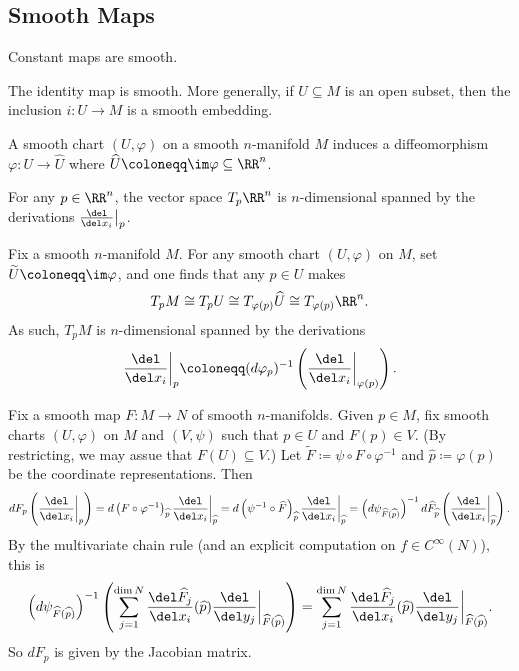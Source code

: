 \documentclass{article}
\begin{document}
\subsection{Smooth Maps}
\begin{example}
	Constant maps are smooth.
\end{example}
\begin{example}
	The identity map is smooth. More generally, if $U\subseteq M$ is an open subset, then the inclusion $i\colon U\to M$ is a smooth embedding.
\end{example}
\begin{example}
	A smooth chart $(U,\varphi)$ on a smooth $n$-manifold $M$ induces a diffeomorphism $\varphi\colon U\to\widehat U$ where $\widehat U\coloneqq\im\varphi\subseteq\RR^n$.
\end{example}
\begin{example}
	For any $p\in\RR^n$, the vector space $T_p\RR^n$ is $n$-dimensional spanned by the derivations $\frac{\del}{\del x_i}\big|_p$.
\end{example}
\begin{example}
	Fix a smooth $n$-manifold $M$. For any smooth chart $(U,\varphi)$ on $M$, set $\widetilde U\coloneqq\im\varphi$, and one finds that any $p\in U$ makes
	\[T_pM\cong T_pU\cong T_{\varphi(p)}\widehat U\cong T_{\varphi(p)}\RR^n.\]
	As such, $T_pM$ is $n$-dimensional spanned by the derivations
	\[\frac{\del}{\del x_i}\bigg|_p\coloneqq(d\varphi_p)^{-1}\left(\frac{\del}{\del x_i}\bigg|_{\varphi(p)}\right).\]
\end{example}
\begin{example}
	Fix a smooth map $F\colon M\to N$ of smooth $n$-manifolds. Given $p\in M$, fix smooth charts $(U,\varphi)$ on $M$ and $(V,\psi)$ such that $p\in U$ and $F(p)\in V$. (By restricting, we may assue that $F(U)\subseteq V$.) Let $\widetilde F\coloneqq\psi\circ F\circ\varphi^{-1}$ and $\widehat p\coloneqq\varphi(p)$ be the coordinate representations. Then
	\[dF_p\left(\frac{\del}{\del x_i}\bigg|_p\right)=d\left(F\circ\varphi^{-1}\right)_{\widehat p}\frac{\del}{\del x_i}\bigg|_{\widehat p}=d\left(\psi^{-1}\circ\widehat F\right)_{\widehat p}\frac{\del}{\del x_i}\bigg|_{\widehat p}=\left(d\psi_{\widehat F(\widehat p)}\right)^{-1}d\widehat F_{\widehat p}\left(\frac{\del}{\del x_i}\bigg|_{\widehat p}\right).\]
	By the multivariate chain rule (and an explicit computation on $f\in C^\infty(N)$), this is
	\[\left(d\psi_{\widehat F(\widehat p)}\right)^{-1}\left(\sum_{j=1}^{\dim N}\frac{\del\widehat F_j}{\del x_i}(\widehat p)\frac{\del}{\del y_j}\bigg|_{\widehat F(\widehat p)}\right)=\sum_{j=1}^{\dim N}\frac{\del\widehat F_j}{\del x_i}(\widehat p)\frac{\del}{\del y_j}\bigg|_{\widehat F(\widehat p)}.\]
	So $dF_p$ is given by the Jacobian matrix.
\end{example}
\end{document}
